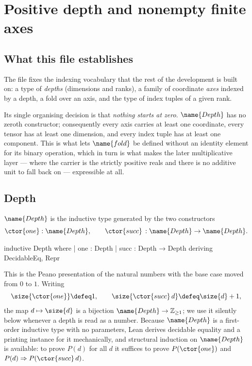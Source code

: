 
\section{Positive depth and nonempty finite axes}
\label{Depth:sec:depth}


\subsection*{What this file establishes}

The file fixes the indexing vocabulary that the rest of the development is
built on: a type of \emph{depths} (dimensions and ranks), a family of
coordinate \emph{axes} indexed by a depth, a fold over an axis, and the type
of index tuples of a given rank.

Its single organising decision is that \emph{nothing starts at zero}.
$\name{Depth}$ has no zeroth constructor; consequently every axis carries at least
one coordinate, every tensor has at least one dimension, and every index
tuple has at least one component.  This is what lets $\name{fold}$ be defined
without an identity element for its binary operation, which in turn is what
makes the later multiplicative layer --- where the carrier is the strictly
positive reals and there is no additive unit to fall back on --- expressible
at all.

\subsection{Depth}

\begin{definition}\label{Depth:def:depth}
$\name{Depth}$ is the inductive type generated by the two constructors
\[
  \ctor{one} : \name{Depth},
  \qquad
  \ctor{succ}\, : \name{Depth} \to \name{Depth} .
\]
\end{definition}

\begin{leancode}
inductive Depth where
  | one : Depth
  | succ : Depth → Depth
  deriving DecidableEq, Repr
\end{leancode}

This is the Peano presentation of the natural numbers with the base case
moved from $0$ to $1$.  Writing
\[
  \size{\ctor{one}} \defeq 1,
  \qquad
  \size{\ctor{succ}\, d} \defeq \size{d} + 1,
\]
the map $d \mapsto \size{d}$ is a bijection $\name{Depth} \to \mathbb{Z}_{\geq 1}$;
we use it silently below whenever a depth is read as a number.  Because
$\name{Depth}$ is a first-order inductive type with no parameters, Lean derives
decidable equality and a printing instance for it mechanically, and structural
induction on $\name{Depth}$ is available: to prove $P(d)$ for all $d$ it suffices to
prove $P(\ctor{one})$ and $P(d) \Rightarrow P(\ctor{succ}\, d)$.

